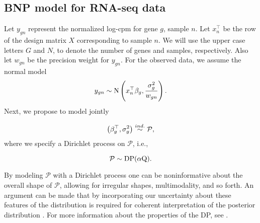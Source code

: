 \subsection{BNP model for RNA-seq data}


\label{sec:model}
Let $y_{gn}$ represent the normalized log-cpm for gene $g$, sample $n$. Let $x_{n}^\top$ be the row of the design matrix $X$ corresponding to sample $n$. We will use the upper case letters $G$ and $N$, to denote the number of genes and samples, respectively. Also let $w_{gn}$ be the precision weight for $y_{gn}$. For the observed data, we assume the normal model
\begin{equation}
y_{gn} \sim \operatorname{N} \left( x_{n}^\top \beta_g, \frac{\sigma^2_g}{w_{gn}} \right).
\end{equation}
Next, we propose to model jointly

\begin{equation}
\left(\beta_g^\top,\sigma^2_g\right) \stackrel{ind.}{\sim} \mathcal{P},
\end{equation}
where we specify a Dirichlet process on $\mathcal{P}$, i.e.,

\begin{equation}
\mathcal{P} \sim \operatorname{DP}(\alpha \mbox{Q}).
\end{equation}

\iftoggle{thesis}{
The use of this prior, due to \citet{ferguson}, is a distribution over probability distributions, such that for any finite disjoint partition $\{A_i\}_{i>=1}^n$ on $\mathbb{R}^p$, $\mathcal{P}$ is a random measure such that the joint distribution $\left(\mathcal{P}(A_1),\ldots,\mathcal{P}(A_n)\right) \sim \op{Dir}\left(\alpha Q(A_1),\ldots,\alpha Q(A_n)\right).$ The Dirichlet process has two parameters: $Q$, the base measure, represents a prior guess at the distribution. $\alpha$, the concentration parameter expresses the degree to which $\mathcal{P}$ will agree with $Q$ on any set $A$. This follows from the definition given above and known properties of the Dirichlet distribution, i.e., $\op{E}\left(\mathcal{P}(A)\right)=Q(A)$, and $\op{V}\left(\mathcal{P}(A)\right)=\frac{Q(A)(1 - Q(A)}{\alpha + 1}$, showing that $\mathcal{P}(A) \stackrel{p}{\rightarrow} Q(A)$ as $\alpha \rightarrow \infty$ for any set $A$. 
}{}
By modeling $\mathcal{P}$ with a Dirichlet process one can be noninformative about the overall shape of $\mathcal{P}$, allowing for irregular shapes, multimodality, and so forth. An argument can be made that by incorporating our uncertainty about these features of the distribution is required for coherent interpretation of the posterior distribution \citep{walker2010bayesian}. For more information about the properties of the DP, see \cite{ferguson}.

